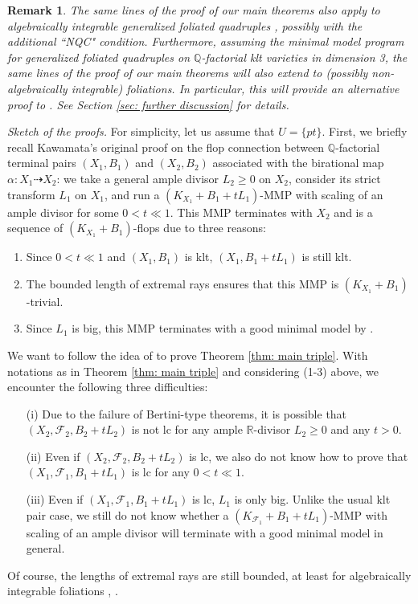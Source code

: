 \documentclass[preprint,12pt]{elsarticle}
\newcommand{\Qq}{\mathbb{Q}}
\newcommand{\Rr}{\mathbb{R}}
\newcommand{\Ff}{\mathcal{F}}
\newtheorem{rem}[thm]{Remark}
\begin{document}
\begin{rem}
The same lines of the proof of our main theorems also apply to algebraically integrable generalized foliated quadruples \cite[Definition 1.2]{LLM23}, possibly with the additional ``NQC" condition. Furthermore, assuming the minimal model program for generalized foliated quadruples on $\Qq$-factorial klt varieties in dimension 3, the same lines of the proof of our main theorems will also extend to (possibly non-algebraically integrable) foliations. In particular, this will provide an alternative proof to \cite[Theorem 1.1]{JV23}. See Section \ref{sec: further discussion} for details. 
\end{rem}



\medskip

\noindent\textit{Sketch of the proofs.} For simplicity, let us assume that $U=\{pt\}$. First, we briefly recall Kawamata's original proof \cite[Theorem 1]{Kaw08} on the flop connection between $\Qq$-factorial terminal pairs $(X_1,B_1)$ and $(X_2,B_2)$ associated with the birational map $\alpha: X_1\dashrightarrow X_2$: we take a general ample divisor $L_2\geq 0$ on $X_2$, consider its strict transform $L_1$ on $X_1$, and run a $(K_{X_1}+B_1+tL_1)$-MMP with scaling of an ample divisor for some $0<t\ll 1$. This MMP terminates with $X_2$ and is a sequence of $(K_{X_1}+B_1)$-flops due to three reasons: 
\begin{enumerate} 
\item Since $0<t\ll 1$ and $(X_1,B_1)$ is klt, $(X_1,B_1+tL_1)$ is still klt. 
\item The bounded length of extremal rays ensures that this MMP is $(K_{X_1}+B_1)$-trivial. 
\item Since $L_1$ is big, this MMP terminates with a good minimal model by \cite{BCHM10}. \end{enumerate} 
We want to follow the idea of \cite[Theorem 1]{Kaw08} to prove Theorem \ref{thm: main triple}. With notations as in Theorem \ref{thm: main triple} and considering (1-3) above, we encounter the following three difficulties: 
\begin{itemize} 
\item[(i)] Due to the failure of Bertini-type theorems, it is possible that $(X_2,\Ff_2,B_2+tL_2)$ is not lc for any ample $\Rr$-divisor $L_2\geq 0$ and any $t>0$. \item[(ii)] Even if $(X_2,\Ff_2,B_2+tL_2)$ is lc, we also do not know how to prove that $(X_1,\Ff_1,B_1+tL_1)$ is lc for any $0<t\ll 1$. \item[(iii)] Even if $(X_1,\Ff_1,B_1+tL_1)$ is lc, $L_1$ is only big. Unlike the usual klt pair case, we still do not know whether a $(K_{\Ff_1}+B_1+tL_1)$-MMP with scaling of an ample divisor will terminate with a good minimal model in general. 
\end{itemize}
Of course, the lengths of extremal rays are still bounded, at least for algebraically integrable foliations \cite[Theorem 3.9]{ACSS21}, \cite[Theorem 2.2.1]{CHLX23}.
\end{document}
